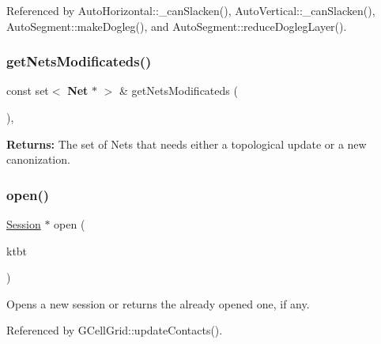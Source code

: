 Referenced by Auto\+Horizontal\+::\+\_\+can\+Slacken(), Auto\+Vertical\+::\+\_\+can\+Slacken(), Auto\+Segment\+::make\+Dogleg(), and Auto\+Segment\+::reduce\+Dogleg\+Layer().

\mbox{\label{classKatabatic_1_1Session_a6c3be93d98029b06138f633342d04157}} 
\subsubsection{\texorpdfstring{get\+Nets\+Modificateds()}{getNetsModificateds()}}
{\footnotesize\ttfamily const set$<$ \textbf{ Net} $\ast$ $>$ \& get\+Nets\+Modificateds (\begin{DoxyParamCaption}{ }\end{DoxyParamCaption})\hspace{0.3cm}{\ttfamily [inline]}, {\ttfamily [static]}}

{\bfseries Returns\+:} The set of Nets that needs either a topological update or a new canonization. \mbox{\label{classKatabatic_1_1Session_a000e098850f6cccff6b289a294149a41}} 
\subsubsection{\texorpdfstring{open()}{open()}}
{\footnotesize\ttfamily \hyperlink{classKatabatic_1_1Session}{Session} $\ast$ open (\begin{DoxyParamCaption}\item[{\hyperlink{classKatabatic_1_1KatabaticEngine}{Katabatic\+Engine} $\ast$}]{ktbt }\end{DoxyParamCaption})\hspace{0.3cm}{\ttfamily [static]}}

Opens a new session or returns the already opened one, if any. 

Referenced by G\+Cell\+Grid\+::update\+Contacts().

\mbox{\label{classKatabatic_1_1Session_a5ae591df94fc66ccb85cbb6565368bca}} 
